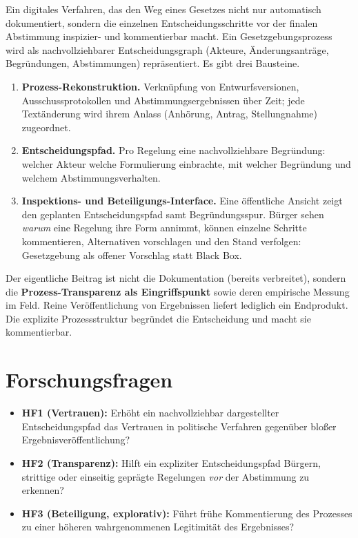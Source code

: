 \documentclass[11pt,a4paper]{scrartcl}
\begin{document}
Ein digitales Verfahren, das den Weg eines Gesetzes nicht nur automatisch dokumentiert,
sondern die einzelnen Entscheidungsschritte vor der finalen Abstimmung inspizier- und
kommentierbar macht. Ein Gesetzgebungsprozess wird als nachvollziehbarer Entscheidungsgraph
(Akteure, Änderungsanträge, Begründungen, Abstimmungen) repräsentiert. Es gibt drei Bausteine.

\begin{enumerate}
  \item \textbf{Prozess-Rekonstruktion.} Verknüpfung von Entwurfsversionen, Ausschussprotokollen
    und Abstimmungsergebnissen über Zeit; jede Textänderung wird ihrem Anlass (Anhörung,
    Antrag, Stellungnahme) zugeordnet.
  \item \textbf{Entscheidungspfad.} Pro Regelung eine nachvollziehbare Begründung: welcher
    Akteur welche Formulierung einbrachte, mit welcher Begründung und welchem Abstimmungsverhalten.
  \item \textbf{Inspektions- und Beteiligungs-Interface.} Eine öffentliche Ansicht zeigt den
    geplanten Entscheidungspfad samt Begründungsspur. Bürger sehen \emph{warum} eine Regelung
    ihre Form annimmt, können einzelne Schritte kommentieren, Alternativen vorschlagen und den
    Stand verfolgen: Gesetzgebung als offener Vorschlag statt Black Box.
\end{enumerate}

Der eigentliche Beitrag ist nicht die Dokumentation (bereits verbreitet), sondern die
\textbf{Prozess-Transparenz als Eingriffspunkt} sowie deren empirische Messung im Feld. Reine
Veröffentlichung von Ergebnissen liefert lediglich ein Endprodukt. Die explizite Prozessstruktur
begründet die Entscheidung und macht sie kommentierbar.

\section{Forschungsfragen}

\begin{itemize}
  \item \textbf{HF1 (Vertrauen):} Erhöht ein nachvollziehbar dargestellter Entscheidungspfad das
    Vertrauen in politische Verfahren gegenüber bloßer Ergebnisveröffentlichung?
  \item \textbf{HF2 (Transparenz):} Hilft ein expliziter Entscheidungspfad Bürgern, strittige
    oder einseitig geprägte Regelungen \emph{vor} der Abstimmung zu erkennen?
  \item \textbf{HF3 (Beteiligung, explorativ):} Führt frühe Kommentierung des Prozesses zu einer
    höheren wahrgenommenen Legitimität des Ergebnisses?
\end{itemize}
\end{document}
